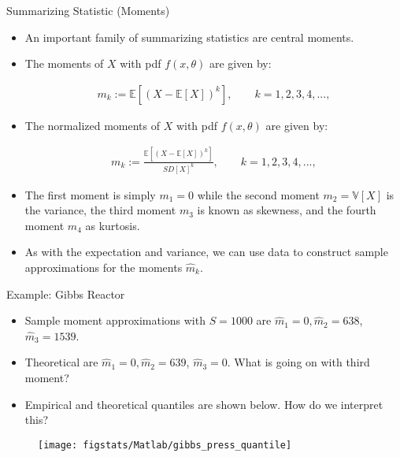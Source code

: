 \documentclass[9pt]{beamer}
\begin{document}
\begin{frame}{Summarizing Statistic (Moments)}

\begin{itemize}
\item An important family of summarizing statistics are central moments. 

\item The moments of $X$ with pdf $f(x,\theta)$ are given by:
\begin{block}{}
\begin{align*}
m_k:=\mathbb{E}[(X-\mathbb{E}[X])^k], \qquad k=1,2,3,4,...,
\end{align*}
\end{block}
\item The normalized moments of $X$ with pdf $f(x,\theta)$ are given by:
\begin{block}{}
\begin{align*}
m_k:=\frac{\mathbb{E}[(X-\mathbb{E}[X])^k]}{SD[X]^k}, \qquad k=1,2,3,4,...,
\end{align*}
\end{block}

\item The first moment is simply $m_1=0$ while the second moment $m_2=\mathbb{V}[X]$ is the variance, the third moment $m_3$ is known as skewness, and the fourth moment  $m_4$ as kurtosis. 

\item As with the expectation and variance, we can use data to construct sample approximations for the moments $\hat{m}_k$. 

\end{itemize}

\end{frame}

\begin{frame}{Example: Gibbs Reactor}
\begin{itemize}
\item Sample moment approximations with $S=1000$ are $\hat{m}_1=0,\hat{m}_2=638$, $\hat{m}_3=1539$.
\item Theoretical are $\hat{m}_1=0,\hat{m}_2=639$, $\hat{m}_3=0$. What is going on with third moment?
\item Empirical and theoretical quantiles are shown below. How do we interpret this? 
\end{itemize}
\begin{figure}[!htb]
    \centering
	\texttt{[image: figstats/Matlab/gibbs\_press\_quantile]}
\end{figure}
\end{frame}
\end{document}
